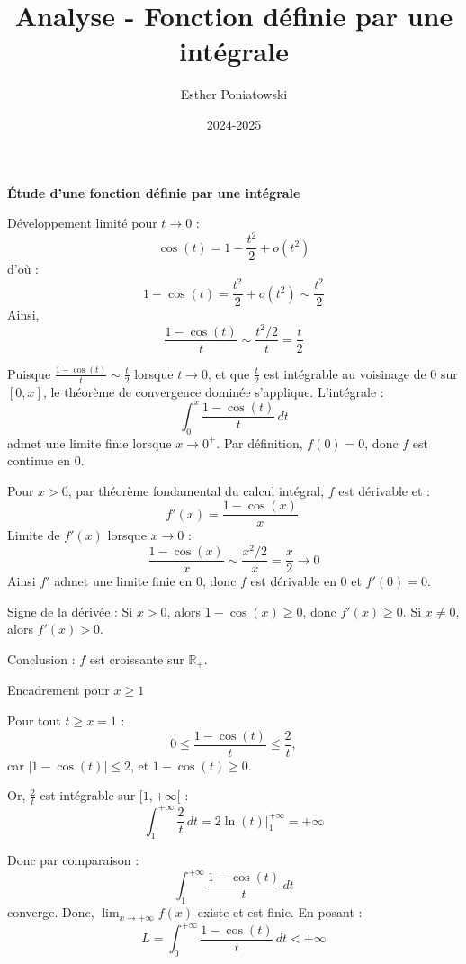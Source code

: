 \documentclass[10pt,a4paper]{article}
\title{Analyse - Fonction définie par une intégrale}
\author{Esther Poniatowski}
\date{2024-2025}
\begin{document}
\vspace{0.5cm}
\textbf{Étude d'une fonction définie par une intégrale}

\q Développement limité pour \( t \to 0 \) :
\[
\cos(t) = 1 - \frac{t^2}{2} + o(t^2)
\]
d'où :
\[
1 - \cos(t) = \frac{t^2}{2} + o(t^2) \sim \frac{t^2}{2}
\]
Ainsi,
\[
\frac{1 - \cos(t)}{t} \sim \frac{t^2/2}{t} = \frac{t}{2}
\]

\q Puisque \( \frac{1 - \cos(t)}{t} \sim \frac{t}{2} \) lorsque \( t \to 0 \), et que \( \frac{t}{2}
\) est intégrable au voisinage de 0 sur \( [0, x] \), le théorème de convergence dominée s'applique.
L'intégrale :
\[
\int_0^x \frac{1 - \cos(t)}{t} \, dt
\]
admet une limite finie lorsque \( x \to 0^+ \). Par définition, \( f(0) = 0 \), donc \( f \) est
continue en 0.

\q Pour \( x > 0 \), par théorème fondamental du calcul intégral, \( f \) est dérivable et :
\[
f'(x) = \frac{1 - \cos(x)}{x}.
\]
Limite de \( f'(x) \) lorsque \( x \to 0 \) :
\[
\frac{1 - \cos(x)}{x} \sim \frac{x^2/2}{x} = \frac{x}{2} \to 0
\]
Ainsi \( f' \) admet une limite finie en 0, donc \( f \) est dérivable en 0 et \( f'(0) = 0 \).

\q Signe de la dérivée :
Si \( x > 0 \), alors \( 1 - \cos(x) \geq 0 \), donc \( f'(x) \geq 0 \).
Si \( x \neq 0 \), alors \( f'(x) > 0 \).

Conclusion : \( f \) est croissante sur \( \mathbb{R}_+ \).

\q Encadrement pour \( x \geq 1 \)

Pour tout \( t \geq x = 1 \) :
\[
0 \leq \frac{1 - \cos(t)}{t} \leq \frac{2}{t},
\]
car \( |1 - \cos(t)| \leq 2 \), et  \( 1 - \cos(t) \geq 0 \).

Or, \( \frac{2}{t} \) est intégrable sur \( [1, +\infty[ \) :
\[
\int_1^{+\infty} \frac{2}{t} \, dt = 2 \ln(t) \big|_1^{+\infty} = +\infty
\]

Donc par comparaison :
\[
\int_1^{+\infty} \frac{1 - \cos(t)}{t} \, dt
\]
converge.
Donc, \( \displaystyle \lim_{x \to +\infty} f(x) \) existe et est finie. En posant :
\[
L = \int_0^{+\infty} \frac{1 - \cos(t)}{t} \, dt < +\infty
\]
\end{document}
